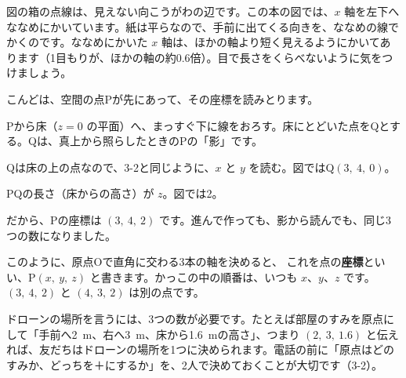 \par\vspace{4pt}
図の箱の点線は、見えない向こうがわの辺です。この本の図では、$x$ 軸を左下へななめにかいています。紙は平らなので、手前に出てくる向きを、ななめの線でかくのです。ななめにかいた $x$ 軸は、ほかの軸より短く見えるようにかいてあります（1目もりが、ほかの軸の約0.6倍）。目で長さをくらべないように気をつけましょう。

こんどは、空間の点Pが先にあって、その座標を読みとります。
\begin{enumerate}[label={\bkcircled[bkOrange]{\arabic*}}, leftmargin=2.4\zw, itemsep=1pt, topsep=2pt]
\item Pから床（$z=0$ の平面）へ、まっすぐ下に線をおろす。床にとどいた点をQとする。Qは、真上から照らしたときのPの「影」です。
\item Qは床の上の点なので、3-2と同じように、$x$ と $y$ を読む。図ではQ$(3,\ 4,\ 0)$。
\item PQの長さ（床からの高さ）が $z$。図では2。
\end{enumerate}
だから、Pの座標は $(3,\ 4,\ 2)$ です。進んで作っても、影から読んでも、同じ3つの数になりました。

このように、原点Oで直角に交わる3本の軸を決めると、
これを点の\textbf{座標}といい、P$(x,\ y,\ z)$ と書きます。かっこの中の順番は、いつも $x$、$y$、$z$ です。$(3,\ 4,\ 2)$ と $(4,\ 3,\ 2)$ は別の点です。

ドローンの場所を言うには、3つの数が必要です。たとえば部屋のすみを原点にして「手前へ\qty{2}{m}、右へ\qty{3}{m}、床から\qty{1.6}{m}の高さ」、つまり $(2,\ 3,\ 1.6)$ と伝えれば、友だちはドローンの場所を1つに決められます。電話の前に「原点はどのすみか、どっちを＋にするか」を、2人で決めておくことが大切です（3-2）。

